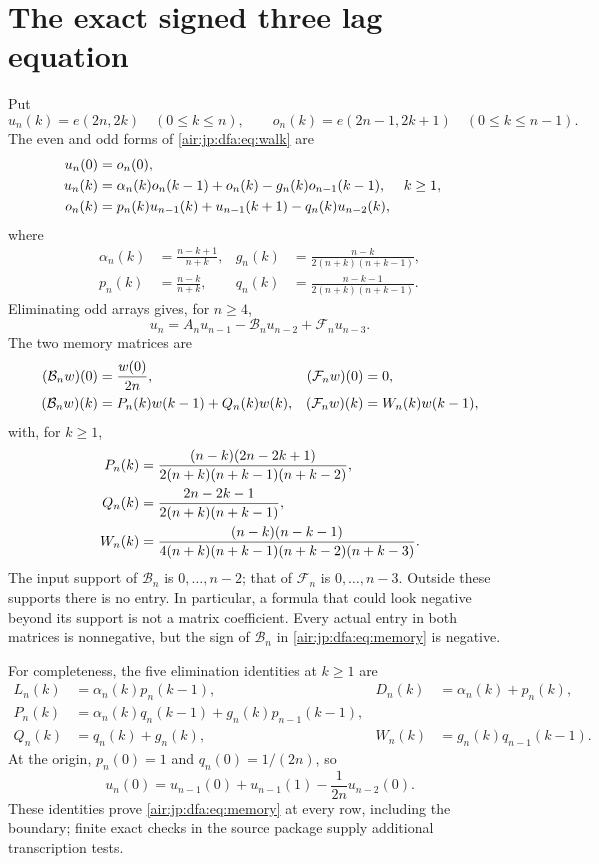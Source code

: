 \documentclass[11pt,letterpaper]{article}
\numberwithin{equation}{section}
\theoremstyle{remark}
\begin{document}
\section{The exact signed three lag equation}\label{air:jp:dfa:sec:memory}
Put
\[
 u_n(k)=e(2n,2k)\quad(0\le k\le n),\qquad
 o_n(k)=e(2n-1,2k+1)\quad(0\le k\le n-1).
\]
The even and odd forms of \eqref{air:jp:dfa:eq:walk} are
\begin{align}
 u_n(0)&=o_n(0),\notag\\
 u_n(k)&=\alpha_n(k)o_n(k-1)+o_n(k)-g_n(k)o_{n-1}(k-1),&&k\ge1,\label{air:jp:dfa:eq:evenodd}\\
 o_n(k)&=p_n(k)u_{n-1}(k)+u_{n-1}(k+1)-q_n(k)u_{n-2}(k),\notag
\end{align}
where
\begin{align*}
 \alpha_n(k)&=\frac{n-k+1}{n+k},&g_n(k)&=\frac{n-k}{2(n+k)(n+k-1)},\\
 p_n(k)&=\frac{n-k}{n+k},&q_n(k)&=\frac{n-k-1}{2(n+k)(n+k-1)}.
\end{align*}
Eliminating odd arrays gives, for $n\ge4$,
\begin{equation}\label{air:jp:dfa:eq:memory}
 u_n=A_nu_{n-1}-\mathcal B_nu_{n-2}+\mathcal F_nu_{n-3}.
\end{equation}
The two memory matrices are
\begin{align}
 (\mathcal B_nw)(0)&=\frac{w(0)}{2n},& (\mathcal F_nw)(0)&=0,\label{air:jp:dfa:eq:memoryorigin}\\
 (\mathcal B_nw)(k)&=P_n(k)w(k-1)+Q_n(k)w(k),&
 (\mathcal F_nw)(k)&=W_n(k)w(k-1),\notag
\end{align}
with, for $k\ge1$,
\begin{align}
 P_n(k)&=\frac{(n-k)(2n-2k+1)}{2(n+k)(n+k-1)(n+k-2)},\notag\\
 Q_n(k)&=\frac{2n-2k-1}{2(n+k)(n+k-1)},\label{air:jp:dfa:eq:bands}\\
 W_n(k)&=\frac{(n-k)(n-k-1)}{4(n+k)(n+k-1)(n+k-2)(n+k-3)}.\notag
\end{align}
The input support of $\mathcal B_n$ is $0,\ldots,n-2$; that of $\mathcal F_n$ is $0,\ldots,n-3$. Outside these supports there is no entry. In particular, a formula that could look negative beyond its support is not a matrix coefficient. Every actual entry in both matrices is nonnegative, but the sign of $\mathcal B_n$ in \eqref{air:jp:dfa:eq:memory} is negative.

For completeness, the five elimination identities at $k\ge1$ are
\begin{align*}
 L_n(k)&=\alpha_n(k)p_n(k-1),&D_n(k)&=\alpha_n(k)+p_n(k),\\
 P_n(k)&=\alpha_n(k)q_n(k-1)+g_n(k)p_{n-1}(k-1),\\
 Q_n(k)&=q_n(k)+g_n(k),&W_n(k)&=g_n(k)q_{n-1}(k-1).
\end{align*}
At the origin, $p_n(0)=1$ and $q_n(0)=1/(2n)$, so
\begin{equation}\label{air:jp:dfa:eq:origin}
 u_n(0)=u_{n-1}(0)+u_{n-1}(1)-\frac1{2n}u_{n-2}(0).
\end{equation}
These identities prove \eqref{air:jp:dfa:eq:memory} at every row, including the boundary; finite exact checks in the source package supply additional transcription tests.
\end{document}
